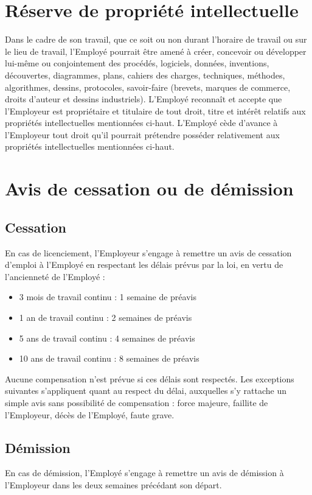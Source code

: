 \documentclass{article}
\begin{document}
    \section{Réserve de propriété intellectuelle}
    Dans le cadre de son travail, que ce soit ou non durant l'horaire de travail ou sur le lieu de travail, l'Employé pourrait être amené à créer, concevoir ou développer lui-même ou conjointement des procédés, logiciels, données, inventions, découvertes, diagrammes, plans, cahiers des charges, techniques, méthodes, algorithmes, dessins, protocoles, savoir-faire (brevets, marques de commerce, droits d'auteur et dessins industriels).
        L'Employé reconnaît et accepte que l'Employeur est propriétaire et titulaire de tout droit, titre et intérêt relatifs aux propriétés intellectuelles mentionnées ci-haut.
        L'Employé cède d'avance à l'Employeur tout droit qu'il pourrait prétendre posséder relativement aux propriétés intellectuelles mentionnées ci-haut.
    
    \section{Avis de cessation ou de démission}
    	\subsection{Cessation}
	    En cas de licenciement, l'Employeur s'engage à remettre un avis de cessation d'emploi à l'Employé en respectant les délais prévus par la loi, en vertu de l'ancienneté de l'Employé :
	    
	    \begin{itemize}
	    	\item 3 mois de travail continu : 1 semaine de préavis
	    	\item 1 an de travail continu : 2 semaines de préavis
	    	\item 5 ans de travail continu : 4 semaines de préavis
	    	\item 10 ans de travail continu : 8 semaines de préavis
	    \end{itemize} \vspace\baselineskip
	    
	    Aucune compensation n'est prévue si ces délais sont respectés. Les exceptions suivantes s'appliquent quant au respect du délai, auxquelles s'y rattache un simple avis sans possibilité de compensation : force majeure, faillite de l'Employeur, décès de l'Employé, faute grave.
			    	
    	\subsection{Démission}
	    En cas de démission, l'Employé s'engage à remettre un avis de démission à l'Employeur dans les deux semaines précédant son départ.
    
\end{document}
